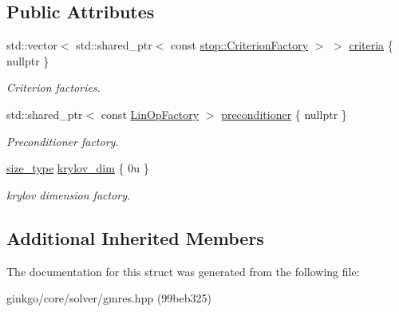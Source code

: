 \subsection*{Public Attributes}
\begin{DoxyCompactItemize}
\item 
\mbox{\label{structgko_1_1solver_1_1Gmres_1_1parameters__type_a7e00d428588b7bcac078083cb03c56c2}} 
std\+::vector$<$ std\+::shared\+\_\+ptr$<$ const \hyperlink{group__stop_gab12a51109c50b35ec36dc5a393d6a9a0}{stop\+::\+Criterion\+Factory} $>$ $>$ \hyperlink{structgko_1_1solver_1_1Gmres_1_1parameters__type_a7e00d428588b7bcac078083cb03c56c2}{criteria} \{ nullptr \}
\begin{DoxyCompactList}\small\item\em Criterion factories. \end{DoxyCompactList}\item 
\mbox{\label{structgko_1_1solver_1_1Gmres_1_1parameters__type_ae20afde8c9429953030e86efd37b0953}} 
std\+::shared\+\_\+ptr$<$ const \hyperlink{classgko_1_1LinOpFactory}{Lin\+Op\+Factory} $>$ \hyperlink{structgko_1_1solver_1_1Gmres_1_1parameters__type_ae20afde8c9429953030e86efd37b0953}{preconditioner} \{ nullptr \}
\begin{DoxyCompactList}\small\item\em Preconditioner factory. \end{DoxyCompactList}\item 
\mbox{\label{structgko_1_1solver_1_1Gmres_1_1parameters__type_a5b88f3758ea7c21c535041289e1b09ce}} 
\hyperlink{namespacegko_a6e5c95df0ae4e47aab2f604a22d98ee7}{size\+\_\+type} \hyperlink{structgko_1_1solver_1_1Gmres_1_1parameters__type_a5b88f3758ea7c21c535041289e1b09ce}{krylov\+\_\+dim} \{ 0u \}
\begin{DoxyCompactList}\small\item\em krylov dimension factory. \end{DoxyCompactList}\end{DoxyCompactItemize}
\subsection*{Additional Inherited Members}


The documentation for this struct was generated from the following file\+:\begin{DoxyCompactItemize}
\item 
ginkgo/core/solver/gmres.\+hpp (99beb325)\end{DoxyCompactItemize}
